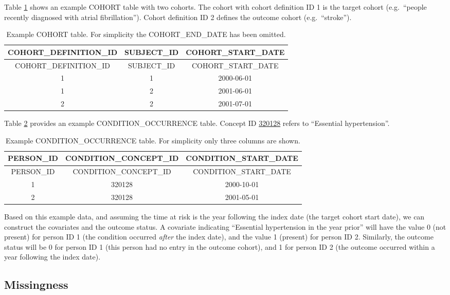 \documentclass[11pt]{book}
\theoremstyle{definition}
\theoremstyle{definition}
\theoremstyle{definition}
\theoremstyle{remark}
\begin{document}
Table \ref{tab:plpExampleCohorts} shows an example COHORT table with two cohorts. The cohort with cohort definition ID 1 is the target cohort (e.g.~``people recently diagnosed with atrial fibrillation''). Cohort definition ID 2 defines the outcome cohort (e.g.~``stroke'').

\begin{longtable}[]{@{}ccc@{}}
\caption{\label{tab:plpExampleCohorts} Example COHORT table. For simplicity the COHORT\_END\_DATE has been omitted.}\tabularnewline
\toprule
COHORT\_DEFINITION\_ID & SUBJECT\_ID & COHORT\_START\_DATE\tabularnewline
\midrule
\endfirsthead
\toprule
COHORT\_DEFINITION\_ID & SUBJECT\_ID & COHORT\_START\_DATE\tabularnewline
\midrule
\endhead
1 & 1 & 2000-06-01\tabularnewline
1 & 2 & 2001-06-01\tabularnewline
2 & 2 & 2001-07-01\tabularnewline
\bottomrule
\end{longtable}

Table \ref{tab:plpExampleConditions} provides an example CONDITION\_OCCURRENCE table. Concept ID \href{http://athena.ohdsi.org/search-terms/terms/320128}{320128} refers to ``Essential hypertension''.

\begin{longtable}[]{@{}ccc@{}}
\caption{\label{tab:plpExampleConditions} Example CONDITION\_OCCURRENCE table. For simplicity only three columns are shown.}\tabularnewline
\toprule
PERSON\_ID & CONDITION\_CONCEPT\_ID & CONDITION\_START\_DATE\tabularnewline
\midrule
\endfirsthead
\toprule
PERSON\_ID & CONDITION\_CONCEPT\_ID & CONDITION\_START\_DATE\tabularnewline
\midrule
\endhead
1 & 320128 & 2000-10-01\tabularnewline
2 & 320128 & 2001-05-01\tabularnewline
\bottomrule
\end{longtable}

Based on this example data, and assuming the time at risk is the year following the index date (the target cohort start date), we can construct the covariates and the outcome status. A covariate indicating ``Essential hypertension in the year prior'' will have the value 0 (not present) for person ID 1 (the condition occurred \emph{after} the index date), and the value 1 (present) for person ID 2. Similarly, the outcome status will be 0 for person ID 1 (this person had no entry in the outcome cohort), and 1 for person ID 2 (the outcome occurred within a year following the index date).

\hypertarget{missingness}{%
\subsection{Missingness}\label{missingness}}
\end{document}
